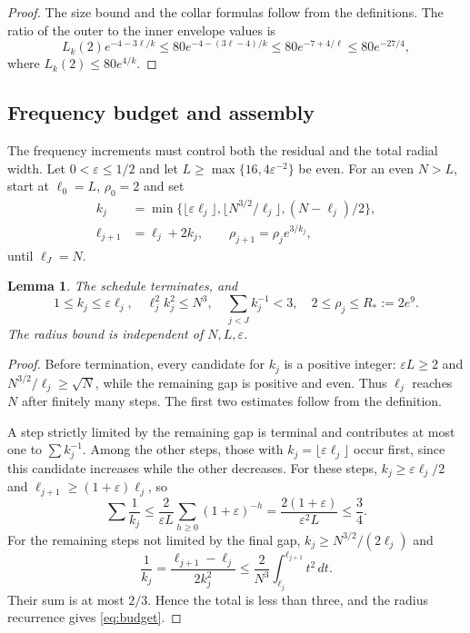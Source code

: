 \documentclass[11pt,twoside,leqno]{article}
\numberwithin{equation}{section}
\newtheorem{lemma}[theorem]{Lemma}
\theoremstyle{definition}
\theoremstyle{remark}
\newcommand{\eps}{\varepsilon}
\begin{document}
\begin{proof}
The size bound and the collar formulas follow from the definitions.
The ratio of the outer to the inner envelope values is
\[
 L_k(2)e^{-4-3\ell/k}
 \le80e^{-4-(3\ell-4)/k}
 \le80e^{-7+4/\ell}\le80e^{-27/4},
\]
where $L_k(2)\le80e^{4/k}$.
\end{proof}

\subsection{Frequency budget and assembly}

The frequency increments must control both the residual and the total
radial width.
Let $0<\eps\le1/2$ and let $L\ge\max\{16,4\eps^{-2}\}$ be even.
For an even $N>L$, start at $\ell_0=L$, $\rho_0=2$ and set
\begin{equation}\label{eq:schedule}
 \begin{split}
 k_j&=\min\{\lfloor\eps\ell_j\rfloor,
             \lfloor N^{3/2}/\ell_j\rfloor,(N-\ell_j)/2\},\\
 \ell_{j+1}&=\ell_j+2k_j,\qquad \rho_{j+1}=\rho_je^{3/k_j},
 \end{split}
\end{equation}
until $\ell_J=N$.

\begin{lemma}\label{lem:budget}
The schedule terminates, and
\begin{equation}\label{eq:budget}
 1\le k_j\le\eps\ell_j,\quad \ell_j^2k_j^2\le N^3,\quad
 \sum_{j<J}k_j^{-1}<3,\quad 2\le\rho_j\le R_*:=2e^9.
\end{equation}
The radius bound is independent of $N,L,\eps$.
\end{lemma}
\begin{proof}
Before termination, every candidate for $k_j$ is a positive integer:
$\eps L\ge2$ and $N^{3/2}/\ell_j\ge\sqrt N$, while the remaining
gap is positive and even. Thus $\ell_j$ reaches $N$ after finitely
many steps. The first two estimates follow from the definition.

A step strictly limited by the remaining gap is terminal and contributes
at most one to $\sum k_j^{-1}$. Among the other steps, those with
$k_j=\lfloor\eps\ell_j\rfloor$ occur first, since this candidate
increases while the other decreases. For these steps,
$k_j\ge\eps\ell_j/2$ and $\ell_{j+1}\ge(1+\eps)\ell_j$, so
\[
 \sum\frac1{k_j}\le\frac{2}{\eps L}
 \sum_{h\ge0}(1+\eps)^{-h}
 =\frac{2(1+\eps)}{\eps^2L}\le\frac34.
\]
For the remaining steps not limited by the final gap,
$k_j\ge N^{3/2}/(2\ell_j)$ and
\[
 \frac1{k_j}=\frac{\ell_{j+1}-\ell_j}{2k_j^2}
 \le\frac2{N^3}\int_{\ell_j}^{\ell_{j+1}}t^2\,dt.
\]
Their sum is at most $2/3$. Hence the total is less than three,
and the radius recurrence gives \eqref{eq:budget}.
\end{proof}
\end{document}
